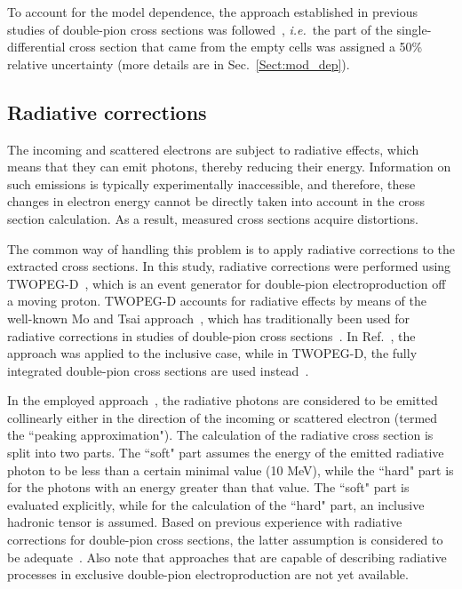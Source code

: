 \documentclass[prc,twocolumn,superscriptaddress,showpacs,amssymb,amsmath,amsfonts,aps,nofootinbib]{revtex4-1}
\begin{document}
To account for the model dependence, the approach established in previous studies of double-pion cross sections was followed~\cite{Isupov:2017lnd,Fed_an_note:2017,Golovach}, {\it i.e.}~the part of the single-differential cross section that came from the empty cells was assigned a 50\% relative uncertainty (more details are in Sec.\!~\ref{Sect:mod_dep}).


\subsection{Radiative corrections}
\label{Sect:rad_corr}

The incoming and scattered electrons are subject to radiative effects, which means that they can emit photons, thereby reducing their energy. Information on such emissions is typically experimentally inaccessible, and therefore, these changes in electron energy cannot be directly taken into account in the cross section calculation. As a result, measured cross sections acquire distortions.


The common way of handling this problem is to apply radiative corrections to the extracted cross sections. In this study, radiative corrections were performed using TWOPEG-D~\cite{twopeg-d}, which is an event generator for double-pion electroproduction off a moving proton. TWOPEG-D accounts for radiative effects by means of the well-known Mo and Tsai approach~\cite{Mo:1968cg}, which has traditionally been used for radiative corrections in studies of double-pion cross sections~\cite{Rip_an_note:2002,Ripani:2002ss,Fed_an_note:2007,Fedotov:2008aa,Fed_an_note:2017,Fed_paper_2018,Isupov:2017lnd,Arjun}. In Ref.\!~\cite{Mo:1968cg}, the approach was applied to the inclusive case, while in TWOPEG-D, the fully integrated double-pion cross sections are used instead~\cite{twopeg,twopeg-d}. 

In the employed approach~\cite{Mo:1968cg,twopeg,twopeg-d}, the radiative photons are considered to be emitted collinearly either in the direction of the incoming or scattered electron (termed the ``peaking approximation"). The calculation of the radiative cross section is split into two parts. The ``soft" part assumes the energy of the emitted radiative photon to be less than a certain minimal value (10 MeV), while the ``hard" part is for the photons with an energy greater than that value. The ``soft" part is evaluated explicitly, while for the calculation of the ``hard" part, an inclusive hadronic tensor is assumed. Based on previous experience with radiative corrections for double-pion cross sections, the latter assumption is considered to be adequate~\cite{Rip_an_note:2002,Ripani:2002ss,Fed_an_note:2007,Fedotov:2008aa,Fed_an_note:2017,Fed_paper_2018,Isupov:2017lnd,Arjun}. Also note that approaches that are capable of describing radiative processes in exclusive double-pion electroproduction are not yet available.
\end{document}
